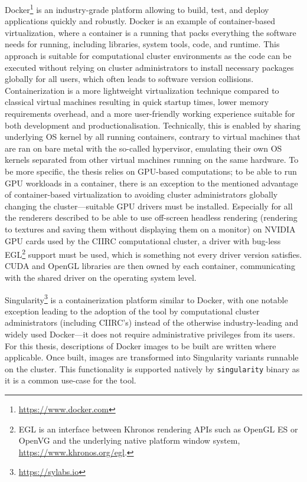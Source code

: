 Docker\footnote{\url{https://www.docker.com}} is an industry-grade platform allowing to
build, test, and deploy applications quickly and robustly. Docker is an example of
container-based virtualization, where a container is a running  that packs
everything the software needs for running, including libraries, system tools, code, and
runtime. This approach is suitable for computational cluster environments as the code can
be executed without relying on cluster administrators to install necessary packages
globally for all users, which often leads to software version collisions.
Containerization is a more lightweight virtualization technique compared to classical
virtual machines resulting in quick startup times, lower memory requirements overhead, and
a more user-friendly working experience suitable for both development and
productionalisation. Technically, this is enabled by sharing underlying OS kernel by all
running containers, contrary to virtual machines that are ran on bare metal with the
so-called hypervisor, emulating their own OS kernels separated from other virtual machines
running on the same hardware. To be more specific, the thesis relies on GPU-based
computations; to be able to run GPU workloads in a container, there is an exception to the
mentioned advantage of container-based virtualization to avoiding cluster administrators
globally changing the cluster---suitable GPU drivers must be installed. Especially for all
the renderers described to be able to use off-screen headless rendering (rendering to
textures and saving them without displaying them on a monitor) on NVIDIA GPU cards used by
the CIIRC computational cluster, a driver with bug-less EGL\footnote{EGL is an interface
between Khronos rendering APIs such as OpenGL ES or OpenVG and the underlying native
platform window system, \url{https://www.khronos.org/egl}.} support must be used, which is
something not every driver version satisfies. CUDA and OpenGL libraries are then owned by
each container, communicating with the shared driver on the operating system level.

Singularity\footnote{\url{https://sylabs.io}} is a containerization platform similar to
Docker, with one notable exception leading to the adoption of the tool by computational
cluster administrators (including CIIRC's) instead of the otherwise industry-leading and
widely used Docker---it does not require administrative privileges from its users. For
this thesis, descriptions of Docker images to be built are written where applicable. Once
built, images are transformed into Singularity variants runnable on the cluster. This
functionality is supported natively by \verb|singularity| binary as it is a common
use-case for the tool.

